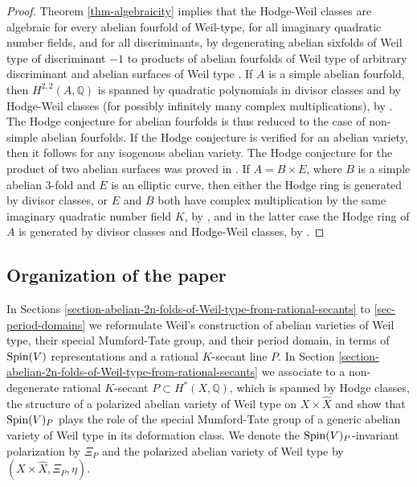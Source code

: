 \documentclass[12pt]{amsart}
\numberwithin{equation}{subsection}
\theoremstyle{plain}
\theoremstyle{definition}
\newcommand{\QQ}{{\mathbb Q}}
\newcommand{\Spin}{{\rm Spin}}
\begin{document}
\begin{proof}
Theorem \ref{thm-algebraicity} 
implies that the Hodge-Weil classes are algebraic for every abelian fourfold of Weil-type, for all imaginary quadratic number fields, and for all discriminants, by  
degenerating abelian sixfolds of Weil type of discriminant $-1$ to products of abelian fourfolds of Weil type of arbitrary discriminant and abelian surfaces of Weil type \cite[Prop. 10]{schoen}. If $A$ is a simple abelian fourfold, then $H^{2,2}(A,\QQ)$ is spanned by quadratic polynomials in divisor classes and by Hodge-Weil classes (for possibly infinitely many complex multiplications), by \cite[Theorem 2.11]{Moonen-Zarhin-Weil-Hodge-Tate-classes}. The Hodge conjecture for abelian fourfolds is thus reduced to the case of non-simple abelian fourfolds. If the Hodge conjecture is verified for an abelian variety, then it follows for any isogenous abelian variety. 
The Hodge conjecture for the product of two abelian surfaces was proved in \cite[Theorem 4.11]{ramon-mari}. If $A=B\times E$, where $B$ is a simple abelian 3-fold and $E$ is an elliptic curve, then either the Hodge ring is generated by divisor classes, or $E$ and $B$ both have complex multiplication by the same imaginary quadratic number field $K$, by \cite[Prop. 3.8]{moonen-zarhin-low-dimension}, and in the latter case the Hodge ring of $A$ is generated by divisor classes and Hodge-Weil classes, by \cite[Theorem 0.1(i)]{moonen-zarhin-low-dimension}.
\end{proof}

% 
\subsection{Organization of the paper}
In Sections \ref{section-abelian-2n-folds-of-Weil-type-from-rational-secants} to \ref{sec-period-domains} we reformulate Weil's construction of abelian varieties of Weil type, their special Mumford-Tate group,  and their period domain, in terms of $\Spin(V)$ representations and a rational $K$-secant line $P$. 
In Section \ref{section-abelian-2n-folds-of-Weil-type-from-rational-secants} we associate to a non-degenerate rational $K$-secant  $P\subset H^*(X,\QQ)$, which is spanned by Hodge classes, the structure of a polarized abelian variety of Weil type on $X\times\hat{X}$ and show that $\Spin(V)_P$ plays the role of the special Mumford-Tate group of a generic abelian variety of Weil type in its deformation class. We denote the $\Spin(V)_P$-invariant polarization by $\Xi_P$ and the polarized abelian variety of Weil type by $(X\times\hat{X},\Xi_P,\eta)$.
\end{document}

